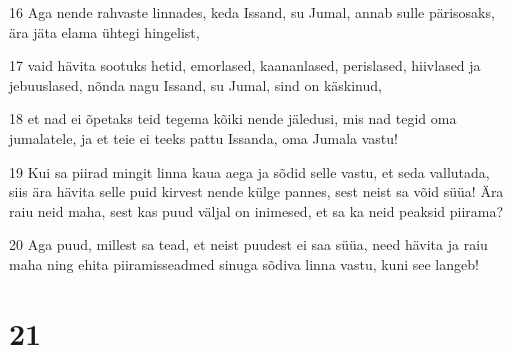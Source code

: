 \par 16 Aga nende rahvaste linnades, keda Issand, su Jumal, annab sulle pärisosaks, ära jäta elama ühtegi hingelist,
\par 17 vaid hävita sootuks hetid, emorlased, kaananlased, perislased, hiivlased ja jebuuslased, nõnda nagu Issand, su Jumal, sind on käskinud,
\par 18 et nad ei õpetaks teid tegema kõiki nende jäledusi, mis nad tegid oma jumalatele, ja et teie ei teeks pattu Issanda, oma Jumala vastu!
\par 19 Kui sa piirad mingit linna kaua aega ja sõdid selle vastu, et seda vallutada, siis ära hävita selle puid kirvest nende külge pannes, sest neist sa võid süüa! Ära raiu neid maha, sest kas puud väljal on inimesed, et sa ka neid peaksid piirama?
\par 20 Aga puud, millest sa tead, et neist puudest ei saa süüa, need hävita ja raiu maha ning ehita piiramisseadmed sinuga sõdiva linna vastu, kuni see langeb!

\chapter{21}

